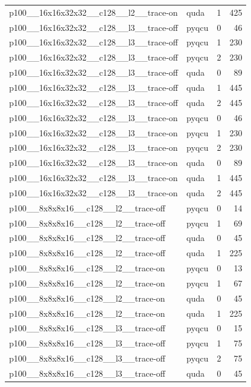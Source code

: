\begin{table}[htbp]
\begin{tabular}{@{}llrr@{}}
p100\_\_16x16x32x32\_\_c128\_\_l2\_\_trace-on & quda & 1 & 425 \\
p100\_\_16x16x32x32\_\_c128\_\_l3\_\_trace-off & pyqcu & 0 & 46 \\
p100\_\_16x16x32x32\_\_c128\_\_l3\_\_trace-off & pyqcu & 1 & 230 \\
p100\_\_16x16x32x32\_\_c128\_\_l3\_\_trace-off & pyqcu & 2 & 230 \\
p100\_\_16x16x32x32\_\_c128\_\_l3\_\_trace-off & quda & 0 & 89 \\
p100\_\_16x16x32x32\_\_c128\_\_l3\_\_trace-off & quda & 1 & 445 \\
p100\_\_16x16x32x32\_\_c128\_\_l3\_\_trace-off & quda & 2 & 445 \\
p100\_\_16x16x32x32\_\_c128\_\_l3\_\_trace-on & pyqcu & 0 & 46 \\
p100\_\_16x16x32x32\_\_c128\_\_l3\_\_trace-on & pyqcu & 1 & 230 \\
p100\_\_16x16x32x32\_\_c128\_\_l3\_\_trace-on & pyqcu & 2 & 230 \\
p100\_\_16x16x32x32\_\_c128\_\_l3\_\_trace-on & quda & 0 & 89 \\
p100\_\_16x16x32x32\_\_c128\_\_l3\_\_trace-on & quda & 1 & 445 \\
p100\_\_16x16x32x32\_\_c128\_\_l3\_\_trace-on & quda & 2 & 445 \\
p100\_\_8x8x8x16\_\_c128\_\_l2\_\_trace-off & pyqcu & 0 & 14 \\
p100\_\_8x8x8x16\_\_c128\_\_l2\_\_trace-off & pyqcu & 1 & 69 \\
p100\_\_8x8x8x16\_\_c128\_\_l2\_\_trace-off & quda & 0 & 45 \\
p100\_\_8x8x8x16\_\_c128\_\_l2\_\_trace-off & quda & 1 & 225 \\
p100\_\_8x8x8x16\_\_c128\_\_l2\_\_trace-on & pyqcu & 0 & 13 \\
p100\_\_8x8x8x16\_\_c128\_\_l2\_\_trace-on & pyqcu & 1 & 67 \\
p100\_\_8x8x8x16\_\_c128\_\_l2\_\_trace-on & quda & 0 & 45 \\
p100\_\_8x8x8x16\_\_c128\_\_l2\_\_trace-on & quda & 1 & 225 \\
p100\_\_8x8x8x16\_\_c128\_\_l3\_\_trace-off & pyqcu & 0 & 15 \\
p100\_\_8x8x8x16\_\_c128\_\_l3\_\_trace-off & pyqcu & 1 & 75 \\
p100\_\_8x8x8x16\_\_c128\_\_l3\_\_trace-off & pyqcu & 2 & 75 \\
p100\_\_8x8x8x16\_\_c128\_\_l3\_\_trace-off & quda & 0 & 45 \\

\end{tabular}
\end{table}
